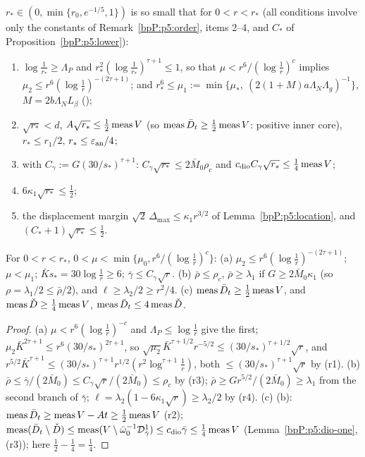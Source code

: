 \begin{definition}\label{bpP:p5:rstar}
$r_*\in(0,\min\{r_0,e^{-1/5},1\})$ is so small that for $0<r<r_*$ (all conditions involve only the constants of Remark~\ref{bpP:p5:order}, items 2--4, and $C_*$ of Proposition~\ref{bpP:p5:lower}):
\begin{enumerate}[label=(r\arabic*)]
\item $\log\frac1{r_*}\ge\Lambda_P$ and $r_*^2(\log\frac1{r_*})^{\tau+1}\le1$, so that $\mu<r^6/(\log\frac1r)^c$ implies $\mu_2\le r^6(\log\frac1r)^{-(2\tau+1)}$; and $r_*^6\le\mu_1:=\min\{\mu_*,\ (2(1+M)a\Lambda_N\Lambda_g)^{-1}\}$, $M=2b\Lambda_NL_\beta$ ();
\item $\sqrt{r_*}<d$, $A\sqrt{r_*}\le\frac12\operatorname{meas} V$ (so $\operatorname{meas}\bar D_t\ge\frac12\operatorname{meas} V$: positive inner core), $r_*\le r_1/2$, $r_*\le\varepsilon_{\rm an}/4$;
\item with $C_\gamma:=G(30/s_*)^{\tau+1}$: $C_\gamma\sqrt{r_*}\le2\bar M_0\rho_c$ and $c_{\rm dio}C_\gamma\sqrt{r_*}\le\frac14\operatorname{meas} V$;
\item $6\kappa_1\sqrt{r_*}\le\frac12$;
\item the displacement margin $\sqrt2\,\Delta_{\max}\le\kappa_1r^{3/2}$ of Lemma~\ref{bpP:p5:location}, and $(C_*+1)\sqrt{r_*}\le\frac12$.
\end{enumerate}
\end{definition}

\begin{lemma}\label{bpP:p5:param-facts}
For $0<r<r_*$, $0<\mu<\min\{\mu_0,r^6/(\log\frac1r)^c\}$:
(a) $\mu_2\le r^6(\log\frac1r)^{-(2\tau+1)}$; $\mu<\mu_1$; $\bar K s_*=30\log\frac1r\ge6$; $\bar\gamma\le C_\gamma\sqrt r$.
(b) $\bar\rho\le\rho_c$, $\bar\rho\ge\lambda_1$ if $G\ge2\bar M_0\kappa_1$ (so $\rho=\lambda_1/2\le\bar\rho/2$), and $\ell\ge\lambda_2/2\ge r^2/4$.
(c) $\operatorname{meas}\bar D_t\ge\frac12\operatorname{meas} V$, and $\operatorname{meas}\check D\ge\frac14\operatorname{meas} V$, $\operatorname{meas}\bar D_t\le4\operatorname{meas}\check D$.
\end{lemma}
\begin{proof}
(a) $\mu<r^6(\log\frac1r)^{-c}$ and $\Lambda_P\le\log\frac1r$ give the first; $\mu_2\bar K^{2\tau+1}\le r^6(30/s_*)^{2\tau+1}$, so $\sqrt{\mu_2}\bar K^{\tau+1/2}r^{-5/2}\le(30/s_*)^{\tau+1/2}\sqrt r$, and $r^{5/2}\bar K^{\tau+1}\le(30/s_*)^{\tau+1}r^{1/2}(r^2\log^{\tau+1}\frac1r)$, both $\le(30/s_*)^{\tau+1}\sqrt r$ by (r1). (b) $\bar\rho\le\bar\gamma/(2\bar M_0)\le C_\gamma\sqrt r/(2\bar M_0)\le\rho_c$ by (r3); $\bar\rho\ge G r^{5/2}/(2\bar M_0)\ge\lambda_1$ from the second branch of $\bar\gamma$; $\ell=\lambda_2(1-6\kappa_1\sqrt r)\ge\lambda_2/2$ by (r4). (c) (b): $\operatorname{meas}\bar D_t\ge\operatorname{meas} V-At\ge\frac12\operatorname{meas} V$ (r2); $\operatorname{meas}(\bar D_t\setminus\check D)\le\operatorname{meas}(V\setminus\bar\omega_0^{-1}\mathcal D^1_{\bar\gamma})\le c_{\rm dio}\bar\gamma\le\frac14\operatorname{meas} V$ (Lemma~\ref{bpP:p5:dio-one}, (r3)); here $\frac12-\frac14=\frac14$.
\end{proof}

